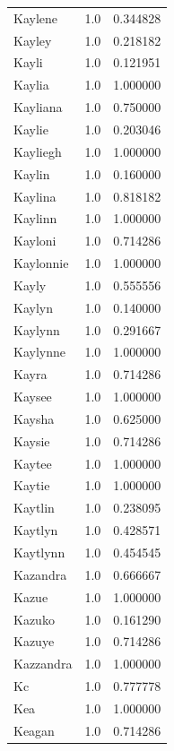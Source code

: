 \documentclass[
  letterpaper,
  DIV=11,
  numbers=noendperiod]{scrreprt}
\begin{document}
\begin{tabular}{lrr}
Kaylene         &   1.0 &   0.344828 \\
Kayley          &   1.0 &   0.218182 \\
Kayli           &   1.0 &   0.121951 \\
Kaylia          &   1.0 &   1.000000 \\
Kayliana        &   1.0 &   0.750000 \\
Kaylie          &   1.0 &   0.203046 \\
Kayliegh        &   1.0 &   1.000000 \\
Kaylin          &   1.0 &   0.160000 \\
Kaylina         &   1.0 &   0.818182 \\
Kaylinn         &   1.0 &   1.000000 \\
Kayloni         &   1.0 &   0.714286 \\
Kaylonnie       &   1.0 &   1.000000 \\
Kayly           &   1.0 &   0.555556 \\
Kaylyn          &   1.0 &   0.140000 \\
Kaylynn         &   1.0 &   0.291667 \\
Kaylynne        &   1.0 &   1.000000 \\
Kayra           &   1.0 &   0.714286 \\
Kaysee          &   1.0 &   1.000000 \\
Kaysha          &   1.0 &   0.625000 \\
Kaysie          &   1.0 &   0.714286 \\
Kaytee          &   1.0 &   1.000000 \\
Kaytie          &   1.0 &   1.000000 \\
Kaytlin         &   1.0 &   0.238095 \\
Kaytlyn         &   1.0 &   0.428571 \\
Kaytlynn        &   1.0 &   0.454545 \\
Kazandra        &   1.0 &   0.666667 \\
Kazue           &   1.0 &   1.000000 \\
Kazuko          &   1.0 &   0.161290 \\
Kazuye          &   1.0 &   0.714286 \\
Kazzandra       &   1.0 &   1.000000 \\
Kc              &   1.0 &   0.777778 \\
Kea             &   1.0 &   1.000000 \\
Keagan          &   1.0 &   0.714286 \\

\end{tabular}
\end{document}
